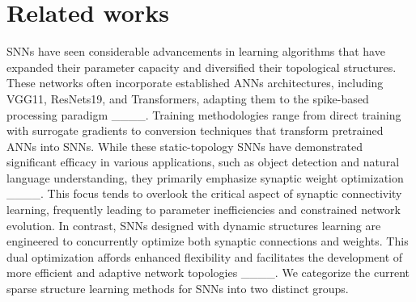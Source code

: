 \section{Related works}

SNNs have seen considerable advancements in learning algorithms that have expanded their parameter capacity and diversified their topological structures. These networks often incorporate established ANNs architectures, including VGG11, ResNets19, and Transformers, adapting them to the spike-based processing paradigm ____. Training methodologies range from direct training with surrogate gradients to conversion techniques that transform pretrained ANNs into SNNs. While these static-topology SNNs have demonstrated significant efficacy in various applications, such as object detection and natural language understanding, they primarily emphasize synaptic weight optimization ____. This focus tends to overlook the critical aspect of synaptic connectivity learning, frequently leading to parameter inefficiencies and constrained network evolution. In contrast, SNNs designed with dynamic structures learning are engineered to concurrently optimize both synaptic connections and weights. This dual optimization affords enhanced flexibility and facilitates the development of more efficient and adaptive network topologies ____. We categorize the current sparse structure learning methods for SNNs into two distinct groups.


